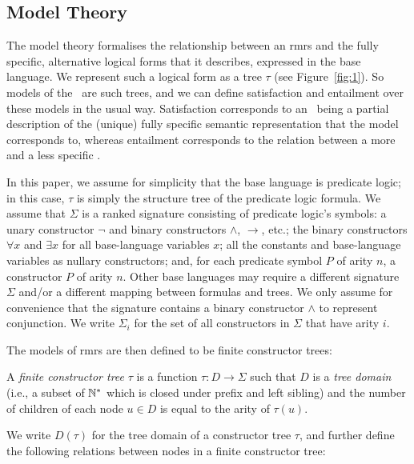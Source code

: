


\subsection{Model Theory}

The model theory formalises the relationship between an {\sc rmrs} and
the fully specific, alternative logical forms that it describes,
expressed in the base language.  We represent such a logical form as a
tree $\tau$ (see Figure~\ref{fig:1}).  So models of the \rmrs\ are
such trees, and we 
can define satisfaction and entailment over these
models in the usual way.  Satisfaction corresponds to 
an \rmrs\ being a partial description of the (unique) fully specific
semantic representation that the model corresponds to, whereas
entailment corresponds to the relation between
a more and a less specific \rmrs.

In this paper, we assume for simplicity that the base language is
predicate logic; in this case, $\tau$ is simply the structure tree of
the predicate logic formula.  We assume that
$\Sigma$ is a ranked signature consisting of predicate logic's
symbols:
a unary constructor $\neg$ and binary constructors $\wedge$,
$\rightarrow$, etc.; the binary constructors $\forall x$ and $\exists
x$ for all base-language variables $x$; all the constants and
base-language variables as nullary constructors; and, for each
predicate symbol $P$ of arity $n$, a constructor $P$ of arity $n$.
Other base languages may require a different signature $\Sigma$ and/or
a different mapping between formulas and trees.  We
only assume for convenience that the signature contains a binary
constructor $\wedge$ to represent conjunction.  We write $\Sigma_i$
for the set of all constructors in $\Sigma$ that have arity $i$.

The models of {\sc rmrs} are then defined to be finite constructor
trees:
\begin{definition}\label{defn:models}
  A {\em finite constructor tree} $\tau$ is a function $\tau:D
  \rightarrow \Sigma$ such that $D$ is a \emph{tree domain} (i.e., a
  subset of $\mathbb{N}^*$ which is closed under prefix and left sibling) and
  the number of children of each node $u \in D$ is equal to the arity
  of $\tau(u)$.  
\end{definition}


We write $D(\tau)$ for the tree domain of a constructor tree $\tau$,
and further define the following relations between nodes in a finite
constructor tree:

